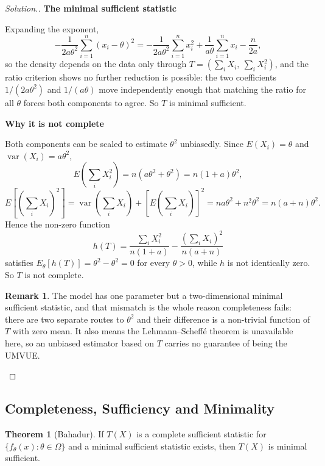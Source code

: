 \documentclass[12pt,a4paper]{report}
\theoremstyle{definition}
\newtheorem{thm}{Theorem}[section]
\newtheorem*{remark}{Remark}
\newcommand{\subhead}[1]{%
  \par\medskip\noindent\textbf{#1}\par\nobreak\smallskip}
\DeclareMathOperator{\var}{var}
\newenvironment{solution}
  {\renewcommand{\qedsymbol}{}\begin{proof}[\textit{Solution}.]}
  {\end{proof}}
\begin{document}
\begin{solution}
\subhead{The minimal sufficient statistic}
Expanding the exponent,
\[-\frac{1}{2a\theta^{2}}\sum_{i=1}^{n}(x_i-\theta)^{2}
= -\frac{1}{2a\theta^{2}}\sum_{i=1}^{n}x_i^{2}
  + \frac{1}{a\theta}\sum_{i=1}^{n}x_i - \frac{n}{2a},\]
so the density depends on the data only through
$T = \left(\sum_i X_i,\ \sum_i X_i^{2}\right)$, and the ratio criterion shows no
further reduction is possible: the two coefficients $1/(2a\theta^{2})$ and
$1/(a\theta)$ move independently enough that matching the ratio for all $\theta$
forces both components to agree. So $T$ is minimal sufficient.

\subhead{Why it is not complete}
Both components can be scaled to estimate $\theta^{2}$ unbiasedly. Since
$E(X_i)=\theta$ and $\var(X_i)=a\theta^{2}$,
\[E\left(\sum_i X_i^{2}\right) = n\left(a\theta^{2}+\theta^{2}\right) = n(1+a)\theta^{2},\]
\[E\left[\left(\sum_i X_i\right)^{2}\right] = \var\left(\sum_i X_i\right) + \left[E\left(\sum_i X_i\right)\right]^{2}
= na\theta^{2} + n^{2}\theta^{2} = n(a+n)\theta^{2}.\]
Hence the non-zero function
\[h(T) = \frac{\sum_i X_i^{2}}{n(1+a)} - \frac{\left(\sum_i X_i\right)^{2}}{n(a+n)}\]
satisfies $E_{\theta}\left[h(T)\right] = \theta^{2}-\theta^{2} = 0$ for every
$\theta>0$, while $h$ is not identically zero. So $T$ is not complete.

\begin{remark}
The model has one parameter but a two-dimensional minimal sufficient statistic,
and that mismatch is the whole reason completeness fails: there are two separate
routes to $\theta^{2}$ and their difference is a non-trivial function of $T$
with zero mean. It also means the Lehmann--Scheff\'e theorem is unavailable
here, so an unbiased estimator based on $T$ carries no guarantee of being the
UMVUE.
\end{remark}
\end{solution}

\subsection{Completeness, Sufficiency and Minimality}

\begin{thm}[Bahadur]
\label{thm:bahadur}
If $T(X)$ is a complete sufficient statistic for $\{f_\theta(x) : \theta\in\Omega\}$
and a minimal sufficient statistic exists, then $T(X)$ is minimal sufficient.
\end{thm}
\end{document}

